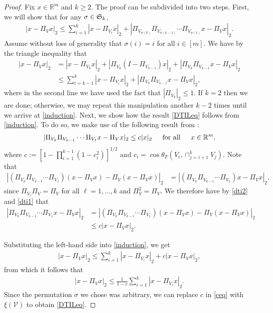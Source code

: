 \documentclass[journal, onecolumn]{IEEEtran}
\begin{document}
\begin{proof} 
Fix $x \in \mathbb{R}^m$ and $k \geq 2$. The proof can be subdivided into two steps. First, we will show that for any $\sigma \in \frak{S}_k$,
\begin{align}\label{induction}
|x - \Pi_Vx|_2 \leq \sum_{i=1}^k |x - \Pi_{V_i} x|_2 + |\Pi_{V_{\sigma(k)}}\Pi_{V_{\sigma(k-1)}}\cdots\Pi_{V_{\sigma(1)}} x - \Pi_V x|_2.
\end{align}
%
Assume without loss of generality that $\sigma(i) = i$ for all $i \in [m]$. We have by the triangle inequality that
\begin{align*}
|x - \Pi_Vx|_2 &= |x - \Pi_{V_k} x|_2 + |\Pi_{V_k}(I - \Pi_{V_{k-1}}) x|_2 + |\Pi_{V_k}\Pi_{V_{k-1}}x - \Pi_Vx|_2 \\
&\leq \sum_{i=k-1}^k|x - \Pi_{V_i} x|_2 + |\Pi_{V_k}\Pi_{V_{k-1}} x - \Pi_V x|_2,
\end{align*}
%
where in the second line we have used the fact that $|\Pi_{V_k}|_2 \leq 1$. If $k=2$ then we are done; otherwise, we may repeat this manipulation another $k-2$ times until we arrive at \eqref{induction}. Next, we show how the result \eqref{DTILeq} follows from \eqref{induction}. To do so, we make use of the following result from \cite[Theorem 9.33]{Deutsch}:
\begin{align}\label{dti2}
|\Pi_{V_k}\Pi_{V_{k-1}}\cdots\Pi_{V_1} x - \Pi_Vx|_2 \leq c |x|_2 \indent \text{for all} \indent x \in \mathbb{R}^m.
\end{align}
%
where $c:= \left[1 - \prod_{i=1}^{k-1}(1-c_i^2)\right]^{1/2}$ and $c_i = \cos\theta_F\left(V_i, \cap_{j=i+1}^kV_j\right)$. Note that
\begin{align}\label{dti1}
|(\Pi_{V_k}\Pi_{V_{k-1}}\cdots\Pi_{V_1})(x - \Pi_Vx) - \Pi_V(x - \Pi_Vx)|_2 
&= |(\Pi_{V_k}\Pi_{V_{k-1}}\cdots\Pi_{V_1}) x - \Pi_V x |_2,
\end{align}
%
since $\Pi_{V_\ell} \Pi_V = \Pi_V$ for all $\ell = 1, \ldots, k$ and $\Pi_V^2 = \Pi_V$.
%
We therefore have by \eqref{dti2} and \eqref{dti1} that
\begin{align*}
|\Pi_{V_k}\Pi_{V_{k-1}}\cdots\Pi_{V_1} x - \Pi_V x |_2
&= |(\Pi_{V_k}\Pi_{V_{k-1}}\cdots\Pi_{V_1})(x - \Pi_Vx) - \Pi_V(x - \Pi_Vx)|_2 \\
&\leq c |x - \Pi_Vx|_2.
\end{align*}

Substituting the left-hand side into \eqref{induction}, we get
\begin{align*}
|x - \Pi_Vx|_2 \leq \sum_{i=1}^k |x - \Pi_{V_i} x|_2 + c |x - \Pi_Vx|_2,
\end{align*}
%
from which it follows that
\begin{align}\label{ceq}
|x - \Pi_V x|_2 \leq \frac{1}{1 - c} \sum_{i=1}^k |x - \Pi_{V_i} x|_2.
\end{align}
Since the permutation $\sigma$ we chose was arbitrary, we can replace $c$ in \eqref{ceq} with $\xi(\mathcal{V})$ to obtain \eqref{DTILeq}.
\end{proof}
\end{document}
